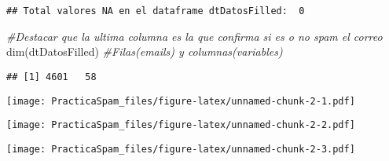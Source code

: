 \documentclass[
]{article}
\newenvironment{Shaded}{\begin{snugshade}}{\end{snugshade}}
\newcommand{\CommentTok}[1]{\textcolor[rgb]{0.56,0.35,0.01}{\textit{#1}}}
\newcommand{\FunctionTok}[1]{\textcolor[rgb]{0.00,0.00,0.00}{#1}}
\newcommand{\NormalTok}[1]{#1}
\newcommand{\SpecialCharTok}[1]{\textcolor[rgb]{0.00,0.00,0.00}{#1}}
\begin{document}
\begin{verbatim}
## Total valores NA en el dataframe dtDatosFilled:  0
\end{verbatim}

\begin{Shaded}
\begin{Highlighting}[]
  \CommentTok{\#Destacar que la ultima columna es la que confirma si es o no spam el correo}
  \FunctionTok{dim}\NormalTok{(dtDatosFilled)  }\CommentTok{\#Filas(emails) y columnas(variables)}
\end{Highlighting}
\end{Shaded}

\begin{verbatim}
## [1] 4601   58
\end{verbatim}

\begin{Shaded}
\end{Shaded}

\texttt{[image: PracticaSpam\_files/figure-latex/unnamed-chunk-2-1.pdf]}

\begin{Shaded}
\end{Shaded}

\texttt{[image: PracticaSpam\_files/figure-latex/unnamed-chunk-2-2.pdf]}

\begin{Shaded}
\end{Shaded}

\texttt{[image: PracticaSpam\_files/figure-latex/unnamed-chunk-2-3.pdf]}

\begin{Shaded}
\end{Shaded}
\end{document}
